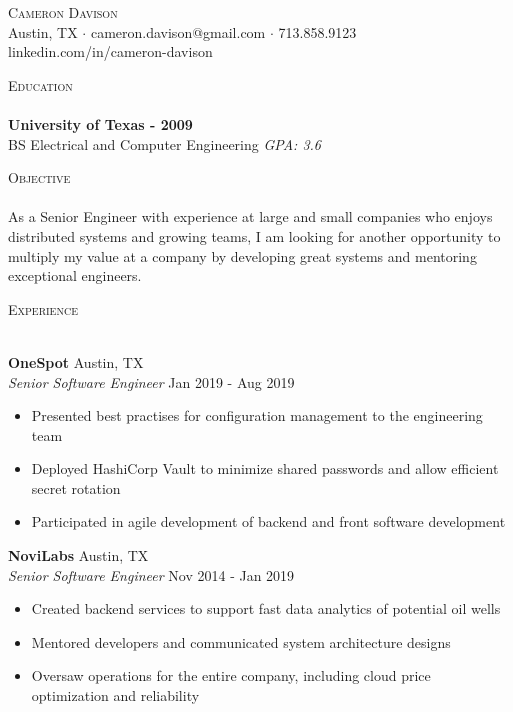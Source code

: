 \documentclass[a4paper]{article}
\newcommand{\lineunder} {
    \vspace*{-8pt} \\
    \hspace*{-18pt} \hrulefill \\
}
\newcommand{\header} [1] {
    {\hspace*{-18pt}\vspace*{6pt} \textsc{#1}}
    \vspace*{-6pt} \lineunder
}
\begin{document}
\vspace*{-40pt}

\vspace*{-10pt}
\begin{center}
    {\Huge \scshape {Cameron Davison}}\\
    Austin, TX $\cdot$ cameron.davison@gmail.com $\cdot$ 713.858.9123\\
    linkedin.com/in/cameron-davison\\
\end{center}

\header{Education}
\textbf{University of Texas - 2009}\\
BS Electrical and Computer Engineering \textit{GPA: 3.6}\\
\vspace{2mm}

\header{Objective}
As a Senior Engineer with experience at large and small companies who enjoys distributed systems and growing teams, I
am looking for another opportunity to multiply my value at a company by developing great systems and mentoring
exceptional engineers.
\vspace{2mm}

\header{Experience}
\vspace{1mm}

\textbf{OneSpot} \hfill Austin, TX\\
\textit{Senior Software Engineer} \hfill Jan 2019 - Aug 2019\\
\vspace{-1mm}
\begin{itemize} \itemsep 1pt
\item Presented best practises for configuration management to the engineering team
\item Deployed HashiCorp Vault to minimize shared passwords and allow efficient secret rotation
\item Participated in agile development of backend and front software development
\end{itemize}

\textbf{NoviLabs} \hfill Austin, TX\\
\textit{Senior Software Engineer} \hfill Nov 2014 - Jan 2019\\
\vspace{-1mm}
\begin{itemize} \itemsep 1pt
\item Created backend services to support fast data analytics of potential oil wells
\item Mentored developers and communicated system architecture designs
\item Oversaw operations for the entire company, including cloud price optimization and reliability
\end{itemize}
\end{document}
